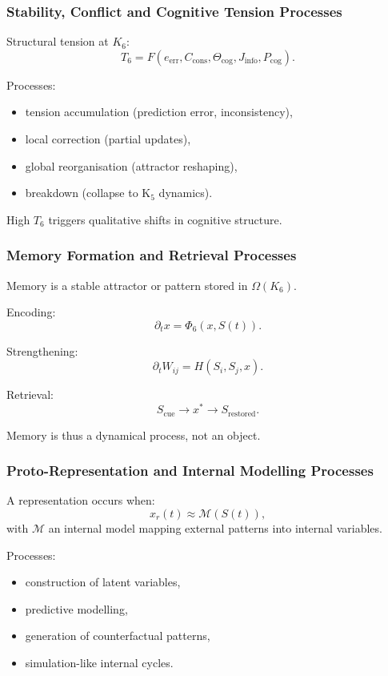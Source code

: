 \subsubsection{Stability, Conflict and Cognitive Tension Processes}

Structural tension at $K_6$:
\[
T_6 = F(e_{\mathrm{err}}, C_{\text{cons}}, \Theta_{\text{cog}}, J_{\text{info}}, P_{\text{cog}}).
\]

Processes:
\begin{itemize}
    \item tension accumulation (prediction error, inconsistency),
    \item local correction (partial updates),
    \item global reorganisation (attractor reshaping),
    \item breakdown (collapse to K$_5$ dynamics).
\end{itemize}

High $T_6$ triggers qualitative shifts in cognitive structure.

\subsubsection{Memory Formation and Retrieval Processes}

Memory is a stable attractor or pattern stored in $\Omega(K_6)$.

Encoding:
\[
\partial_t x = \Phi_6(x, S(t)).
\]

Strengthening:
\[
\partial_t W_{ij} = H(S_i, S_j, x).
\]

Retrieval:
\[
S_{\text{cue}} \to x^\ast \to S_{\text{restored}}.
\]

Memory is thus a dynamical process, not an object.

\subsubsection{Proto-Representation and Internal Modelling Processes}

A representation occurs when:
\[
x_r(t) \approx \mathcal{M}(S(t)),
\]
with $\mathcal{M}$ an internal model mapping external patterns into
internal variables.

Processes:
\begin{itemize}
    \item construction of latent variables,
    \item predictive modelling,
    \item generation of counterfactual patterns,
    \item simulation-like internal cycles.
\end{itemize}

